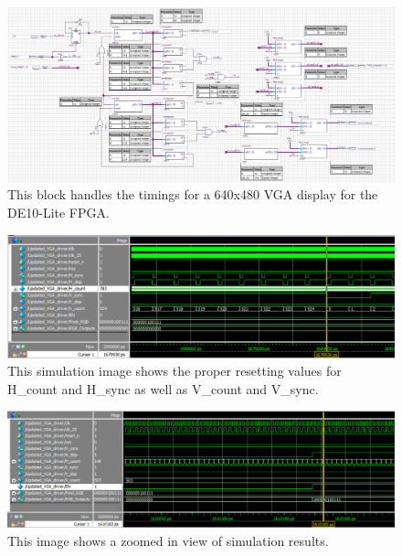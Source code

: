 \documentclass[a4paper]{article}
\begin{document}
\begin{figure}[H]
    \centering
    \includegraphics[width=5.91in]{Images/VGA_driver.jpg}
    \caption{This block handles the timings for a 640x480 VGA display for the DE10-Lite FPGA.}
    \label{fig:VGA_dBlock}
\end{figure}

\begin{figure}[H]
    \centering
    \includegraphics[width=5.91in]{Images/VGA_Driver Proper H_V resets.png}
    \caption{This simulation image shows the proper resetting values for H\_count and H\_sync as well as V\_count and V\_sync.}
    \label{fig:VGAHV_sim}
\end{figure}

\begin{figure}[H]
    \centering
    \includegraphics[width=5.91in]{Images/VGA Simulation.png}
    \caption{This image shows a zoomed in view of simulation results.}
    \label{fig:VGA_sim}
\end{figure}
\end{document}
